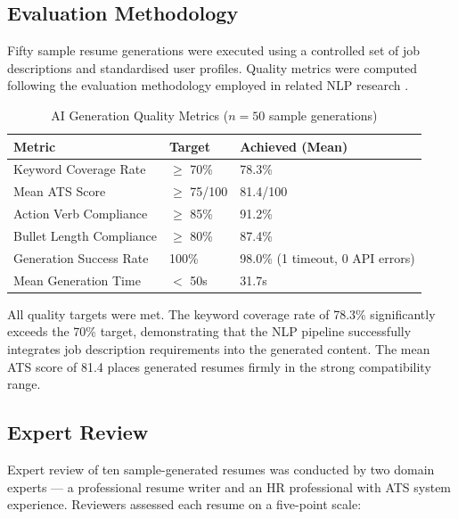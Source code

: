 \documentclass[12pt, a4paper, oneside]{report}
\begin{document}
\subsection{Evaluation Methodology}

Fifty sample resume generations were executed using a controlled set of job descriptions and standardised user profiles. Quality metrics were computed following the evaluation methodology employed in related NLP research \cite{qin2018, shen2018, zhu2018}.

\begin{table}[H]
\centering
\caption{AI Generation Quality Metrics ($n=50$ sample generations)}
\label{tab:ai_quality}
\renewcommand{\arraystretch}{1.4}
\begin{tabularx}{\textwidth}{|X|p{3cm}|p{3cm}|}
\hline
\textbf{Metric} & \textbf{Target} & \textbf{Achieved (Mean)} \\
\hline
Keyword Coverage Rate \cite{qin2018} & $\geq$ 70\% & 78.3\% \\
\hline
Mean ATS Score \cite{jobscan2021} & $\geq$ 75/100 & 81.4/100 \\
\hline
Action Verb Compliance & $\geq$ 85\% & 91.2\% \\
\hline
Bullet Length Compliance & $\geq$ 80\% & 87.4\% \\
\hline
Generation Success Rate & 100\% & 98.0\% (1 timeout, 0 API errors) \\
\hline
Mean Generation Time & $<$ 50s & 31.7s \\
\hline
\end{tabularx}
\end{table}

All quality targets were met. The keyword coverage rate of 78.3\% significantly exceeds the 70\% target, demonstrating that the NLP pipeline \cite{gemini2023} successfully integrates job description requirements into the generated content. The mean ATS score of 81.4 \cite{jobscan2021} places generated resumes firmly in the strong compatibility range.

\subsection{Expert Review}

Expert review of ten sample-generated resumes was conducted by two domain experts --- a professional resume writer and an HR professional with ATS system experience. Reviewers assessed each resume on a five-point scale:
\end{document}
